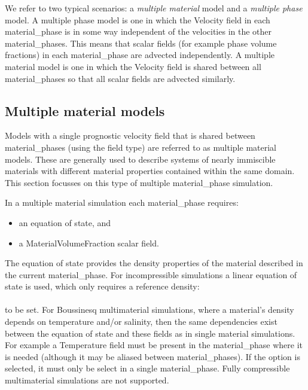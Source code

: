 We refer to two typical scenarios: a \emph{multiple material} model and a \emph{multiple phase} model. A multiple phase model is one in which the Velocity field in each material\_phase is in some way independent of the velocities in the other material\_phases.  This means that scalar fields (for example phase volume fractions) in each material\_phase are advected independently.  A multiple material model is one in which the Velocity field is shared between all material\_phases so that all scalar fields are advected similarly.

\subsection{Multiple material models}

Models with a single prognostic velocity field that is shared between material\_phases (using the  field type) are referred to as multiple material models.  These are generally used to describe systems of nearly immiscible materials with different material properties contained within the same domain.  This section focusses on this type of multiple material\_phase simulation.

In a multiple material simulation each material\_phase requires:
\begin{itemize}
\item an equation of state, and
\item a MaterialVolumeFraction scalar field.
\end{itemize}

The equation of state provides the density properties of the material described in the current material\_phase.  For incompressible simulations a linear equation of state is used, which only requires a reference density:\\
\\
to be set.  For Boussinesq multimaterial simulations, where a material's density depends on temperature and/or salinity, then the same dependencies exist between the equation of state and these fields as in single material simulations.  For example a Temperature field must be present in the material\_phase where it is needed (although it may be aliased between material\_phases).  If the  option is selected, it must only be select in a single material\_phase.  Fully compressible multimaterial simulations are not supported.

